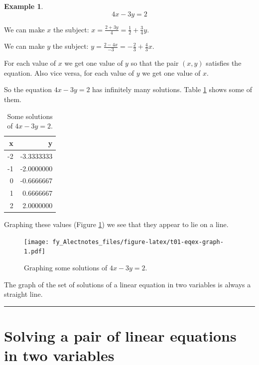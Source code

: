 \documentclass[
  12pt,
  oneside]{book}
\theoremstyle{definition}
\theoremstyle{definition}
\newtheorem{example}{Example}[chapter]
\theoremstyle{definition}
\theoremstyle{definition}
\theoremstyle{remark}
\begin{document}
\begin{example}
\protect\hypertarget{exm:unnamed-chunk-4}{}\label{exm:unnamed-chunk-4}\[4x-3y=2\]
\end{example}

We can make \(x\) the subject: \(x=\frac{2+3y}{4}=\frac{1}{2}+\frac{3}{4}y\).

We can make \(y\) the subject: \(y=\frac{2-4x}{-3} = -\frac{2}{3} +\frac{4}{3}x\).

For each value of \(x\) we get one value of \(y\) so that the pair \((x,y)\) satisfies the equation. Also vice versa, for each value of \(y\) we get one value of \(x\).

So the equation \(4x-3y=2\) has infinitely many solutions. Table \ref{tab:t01-eqex-table} shows some of them.

\begin{table}

\caption{\label{tab:t01-eqex-table}Some solutions of \(4x-3y=2\).}
\centering
\begin{tabular}[t]{rr}
\toprule
x & y\\
\midrule
-2 & -3.3333333\\
-1 & -2.0000000\\
0 & -0.6666667\\
1 & 0.6666667\\
2 & 2.0000000\\
\bottomrule
\end{tabular}
\end{table}

Graphing these values (Figure \ref{fig:t01-eqex-graph}) we see that they appear to lie on a line.

\begin{figure}
\centering
\texttt{[image: fy\_Alectnotes\_files/figure-latex/t01-eqex-graph-1.pdf]}
\caption{\label{fig:t01-eqex-graph}Graphing some solutions of \(4x-3y=2\).}
\end{figure}

The graph of the set of solutions of a linear equation in two variables is always a straight line.

\begin{center}\rule{0.5\linewidth}{0.5pt}\end{center}

\section{Solving a pair of linear equations in two variables}\label{solving-a-pair-of-linear-equations-in-two-variables}
\end{document}
